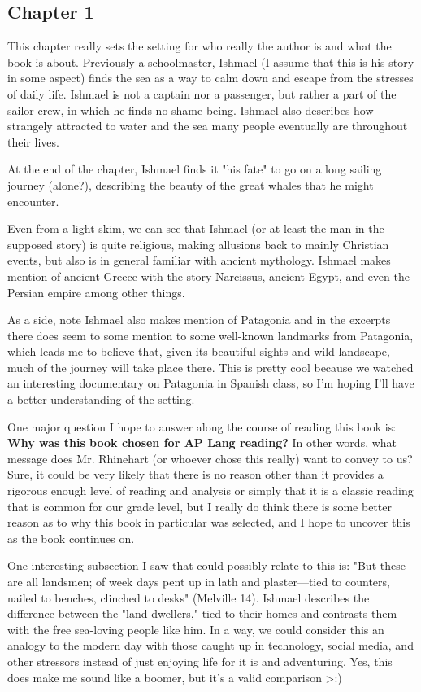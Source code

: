 \subsection{Chapter 1}

This chapter really sets the setting for who really the author is and what the
book is about. Previously a schoolmaster, Ishmael (I assume that this is his
story in some aspect) finds the sea as a way to calm down and escape from the
stresses of daily life. Ishmael is not a captain nor a passenger, but rather a
part of the sailor crew, in which he finds no shame being. Ishmael also
describes how strangely attracted to water and the sea many people eventually
are throughout their lives.

At the end of the chapter, Ishmael finds it "his fate" to go on a long sailing
journey (alone?), describing the beauty of the great whales that he might
encounter.

Even from a light skim, we can see that Ishmael (or at least the man in the
supposed story) is quite religious, making allusions back to mainly Christian
events, but also is in general familiar with ancient mythology. Ishmael makes
mention of ancient Greece with the story Narcissus, ancient Egypt, and even the
Persian empire among other things.

As a side, note Ishmael also makes mention of Patagonia and in the excerpts
there does seem to some mention to some well-known landmarks from Patagonia,
which leads me to believe that, given its beautiful sights and wild landscape,
much of the journey will take place there. This is pretty cool because we
watched an interesting documentary on Patagonia in Spanish class, so I'm hoping
I'll have a better understanding of the setting.

One major question I hope to answer along the course of reading this book is:
\textbf{Why was this book chosen for AP Lang reading?} In other words, what
message does Mr. Rhinehart (or whoever chose this really) want to convey to us?
Sure, it could be very likely that there is no reason other than it provides a
rigorous enough level of reading and analysis or simply that it is a classic
reading that is common for our grade level, but I really do think there is some
better reason as to why this book in particular was selected, and I hope to
uncover this as the book continues on.

One interesting subsection I saw that could possibly relate to this is: "But these
are all landsmen; of week days pent up in lath and plaster---tied to counters,
nailed to benches, clinched to desks" (Melville 14). Ishmael describes the
difference between the "land-dwellers," tied to their homes and contrasts them
with the free sea-loving people like him. In a way, we could consider this an
analogy to the modern day with those caught up in technology, social media, and
other stressors instead of just enjoying life for it is and adventuring. Yes,
this does make me sound like a boomer, but it's a valid comparison >:)

